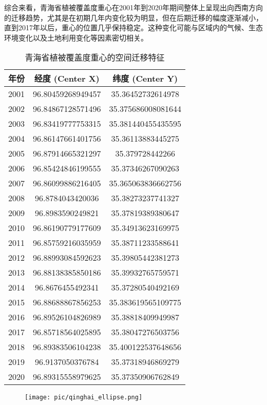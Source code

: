 \documentclass{article}
\begin{document}
		综合来看，青海省植被覆盖度重心在2001年到2020年期间整体上呈现出向西南方向的迁移趋势，尤其是在初期几年内变化较为明显，但在后期迁移的幅度逐渐减小，直到2017年以后，重心的位置几乎保持稳定。这种变化可能与区域内的气候、生态环境变化以及土地利用变化等因素密切相关。
		\begin{table}[H] 
			\centering
			\begin{tabular}{|c|c|c|}
				\hline
				\textbf{年份} & \textbf{经度 (Center X)} & \textbf{纬度 (Center Y)} \\
				\hline
				2001 & 96.80459268949457 & 35.36452732614978 \\
				2002 & 96.84867128571496 & 35.375686008081644 \\
				2003 & 96.83419777753315 & 35.381440455435595 \\
				2004 & 96.86147661401756 & 35.36113883445275 \\
				2005 & 96.87914665321297 & 35.379728442266 \\
				2006 & 96.85424846199555 & 35.37346267090263 \\
				2007 & 96.86099886216405 & 35.365063836662756 \\
				2008 & 96.8784043420036 & 35.38273237741327 \\
				2009 & 96.8983590249821 & 35.37819389380647 \\
				2010 & 96.86190779177609 & 35.34913623169975 \\
				2011 & 96.85759216035959 & 35.38711233588641 \\
				2012 & 96.88993084592623 & 35.39805442381273 \\
				2013 & 96.88138385850186 & 35.39932765759571 \\
				2014 & 96.8676455492341 & 35.37280540492169 \\
				2015 & 96.88688867856253 & 35.383619565109775 \\
				2016 & 96.89526104826989 & 35.38818409949987 \\
				2017 & 96.85718564025895 & 35.38047276503756 \\
				2018 & 96.89383506104238 & 35.400122537648656 \\
				2019 & 96.9137050376784 & 35.37318946869279 \\
				2020 & 96.89315558979625 & 35.37350906762849 \\
				\hline
			\end{tabular}
			\caption{青海省植被覆盖度重心的空间迁移特征}
		\end{table}
			\begin{figure}[H]  %
			\centering
			\texttt{[image: pic/qinghai\_ellipse.png]} %
		\end{figure}
		
\end{document}
